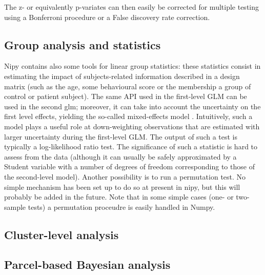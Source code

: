 \documentclass{bioinfo}
\begin{document}

\begin{widetext}

\end{widetext}

The z- or equivalently p-variates can then easily be corrected for
multiple testing using a Bonferroni procedure or a False discovery
rate correction.

\subsection{Group analysis and statistics}
Nipy contains also some tools for linear group statistics: these
statistics consist in estimating the impact of subjects-related
information described in a design matrix (such as the age, some
behavioural score or the membership a group of control or patient
subject).
%
The same API used in the first-level GLM can be used in the second
glm; moreover, it can take into account the uncertainty on the first
level effects, yielding the so-called mixed-effects model \cite{Roche2007}.
%
Intuitively, such a model plays a useful role at down-weighting
observations that are estimated with larger uncertainty during the
first-level GLM.
%
The output of such a test is typically a log-likelihood ratio test.
The significance of such a statistic is hard to assess from the data
(although it can usually be safely approximated by a Student variable
with a number of degrees of freedom corresponding to those of the
second-level model).
%
Another possibility is to run a permutation test. No simple mechanism
has been set up to do so at present in nipy, but this will probably be
added in the future.
%
Note that in some simple cases (one- or two-sample tests) a
permutation proceudre is easily handled in Numpy.
%

\subsection{Cluster-level analysis}


\subsection{Parcel-based Bayesian analysis}
\end{document}

